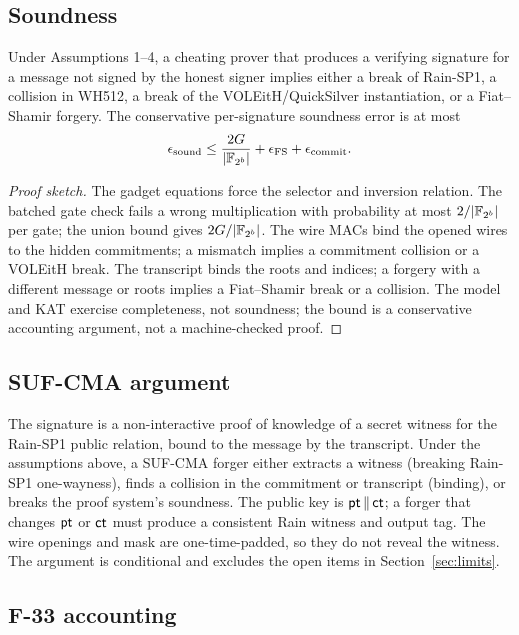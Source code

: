 \documentclass[11pt,a4paper]{article}
\begin{document}
\subsection{Soundness}

\begin{proposition}
Under Assumptions 1--4, a cheating prover that produces a verifying signature
for a message not signed by the honest signer implies either a break of
Rain-SP1, a collision in WH512, a break of the VOLEitH/QuickSilver
instantiation, or a Fiat--Shamir forgery. The conservative per-signature
soundness error is at most
\[
\epsilon_{\mathrm{sound}}
\le \frac{2G}{|\mathbb{F}_{2^{b}}|}+\epsilon_{\mathrm{FS}}+\epsilon_{\mathrm{commit}}.
\]
\end{proposition}
\begin{proof}[Proof sketch]
The gadget equations force the selector and inversion relation. The batched
gate check fails a wrong multiplication with probability at most $2/|\mathbb{F}_{2^{b}}|$
per gate; the union bound gives $2G/|\mathbb{F}_{2^{b}}|$. The wire MACs bind the opened
wires to the hidden commitments; a mismatch implies a commitment collision or
a VOLEitH break. The transcript binds the roots and indices; a forgery with a
different message or roots implies a Fiat--Shamir break or a collision. The
model and KAT exercise completeness, not soundness; the bound is a
conservative accounting argument, not a machine-checked proof.
\end{proof}

\subsection{SUF-CMA argument}

The signature is a non-interactive proof of knowledge of a secret witness for
the Rain-SP1 public relation, bound to the message by the transcript. Under
the assumptions above, a SUF-CMA forger either extracts a witness (breaking
Rain-SP1 one-wayness), finds a collision in the commitment or transcript
(binding), or breaks the proof system's soundness. The public key is
$\mathsf{pt}\,\|\,\mathsf{ct}$; a forger that changes $\mathsf{pt}$ or $\mathsf{ct}$ must produce a
consistent Rain witness and output tag. The wire openings and mask are
one-time-padded, so they do not reveal the witness. The argument is
conditional and excludes the open items in Section~\ref{sec:limits}.

\subsection{F-33 accounting}
\end{document}
